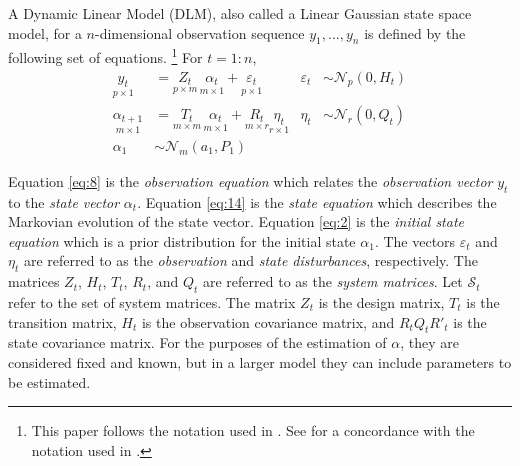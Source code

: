 \documentclass{article}
\newcommand{\dist}[1]{\mathcal{#1}}
\newcommand{\paren}[1]{\ensuremath{\left(#1\right)}}
\newcommand{\dmvnorm}[2]{\ensuremath{\dist{N}_{#2}\paren{#1}}}
\begin{document}
A Dynamic Linear Model (DLM), also called a Linear Gaussian state space model, for a $n$-dimensional observation sequence $y_{1}, \dots, y_{n}$ is defined by the following set of equations.%
\footnote{This paper follows the notation used in \textcite{DurbinKoopman2001}. See \textcite{PetrisPetroneEtAl2009} for a concordance with the notation used in \textcite{WestHarrison1997}.}
For $t = 1:n$,
\begin{align}
  \label{eq:8}
  \underset{p \times 1}{y_t} &= \underset{p \times m}{Z_{t}} \, \underset{m \times 1}{\alpha_t} + \underset{p \times 1}{\varepsilon_t} & \varepsilon_{t} &\sim \dmvnorm{0, H_{t}}{p} \\
  \label{eq:14}
  \underset{m \times 1}{\alpha_{t+1}} &= \underset{m \times m}{T_{t}} \, \underset{m \times 1}{\alpha_{t}} + \underset{m \times r}{R_{t}}  \underset{r \times 1}{\eta_{t}} & \eta_{t} &\sim \dmvnorm{0, Q_{t}}{r} \\
  \label{eq:2}
  \alpha_{1} & \sim \dmvnorm{a_{1}, P_{1}}{m}
\end{align}

Equation \eqref{eq:8} is the \textit{observation equation} which relates the \textit{observation vector} $y_{t}$ to the \textit{state vector} $\alpha_{t}$.
Equation \eqref{eq:14} is the \textit{state equation} which describes the Markovian evolution of the state vector.
Equation \eqref{eq:2} is the \textit{initial state equation} which is a prior distribution for the initial state $\alpha_{1}$.
The vectors $\varepsilon_{t}$ and $\eta_{t}$ are referred to as the \textit{observation} and \textit{state disturbances}, respectively.
The matrices $Z_{t}$, $H_{t}$, $T_{t}$, $R_{t}$, and $Q_{t}$ are referred to as the \textit{system matrices}.
Let $\mathcal{S}_{t}$ refer to the set of system matrices.
The matrix $Z_{t}$ is the design matrix, $T_{t}$ is the transition matrix, $H_{t}$ is the observation covariance matrix, and $R_{t} Q_{t} R'_{t}$ is the state covariance matrix.
For the purposes of the estimation of $\alpha$, they are considered fixed and known, but in a larger model they can include parameters to be estimated.
\end{document}
